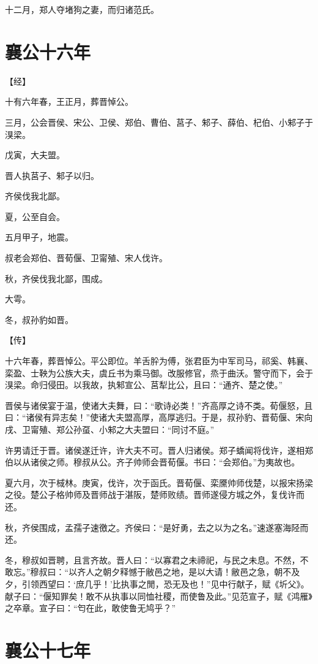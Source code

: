 \documentclass[a4paper,12pt,UTF8,twoside]{ctexbook}
\begin{document}
十二月，郑人夺堵狗之妻，而归诸范氏。

\chapter{襄公十六年}


【经】

十有六年春，王正月，葬晋悼公。

三月，公会晋侯、宋公、卫侯、郑伯、曹伯、莒子、邾子、薛伯、杞伯、小邾子于湨梁。

戊寅，大夫盟。

晋人执莒子、邾子以归。

齐侯伐我北鄙。

夏，公至自会。

五月甲子，地震。

叔老会郑伯、晋荀偃、卫甯殖、宋人伐许。

秋，齐侯伐我北鄙，围成。

大雩。

冬，叔孙豹如晋。

【传】

十六年春，葬晋悼公。平公即位。羊舌肸为傅，张君臣为中军司马，祁奚、韩襄、栾盈、士鞅为公族大夫，虞丘书为乘马御。改服修官，烝于曲沃。警守而下，会于湨梁。命归侵田。以我故，执邾宣公、莒犁比公，且曰：“通齐、楚之使。”

晋侯与诸侯宴于温，使诸大夫舞，曰：“歌诗必类！”齐高厚之诗不类。荀偃怒，且曰：“诸侯有异志矣！”使诸大夫盟高厚，高厚逃归。于是，叔孙豹、晋荀偃、宋向戌、卫甯殖、郑公孙虿、小邾之大夫盟曰：“同讨不庭。”

许男请迁于晋。诸侯遂迁许，许大夫不可。晋人归诸侯。郑子蟜闻将伐许，遂相郑伯以从诸侯之师。穆叔从公。齐子帅师会晋荀偃。书曰：“会郑伯。”为夷故也。

夏六月，次于棫林。庚寅，伐许，次于函氏。晋荀偃、栾黡帅师伐楚，以报宋扬梁之役。楚公子格帅师及晋师战于湛阪，楚师败绩。晋师遂侵方城之外，复伐许而还。

秋，齐侯围成，孟孺子速徼之。齐侯曰：“是好勇，去之以为之名。”速遂塞海陉而还。

冬，穆叔如晋聘，且言齐故。晋人曰：“以寡君之未禘祀，与民之未息。不然，不敢忘。”穆叔曰：“以齐人之朝夕释憾于敝邑之地，是以大请！敝邑之急，朝不及夕，引领西望曰：‘庶几乎！’比执事之閒，恐无及也！”见中行献子，赋《圻父》。献子曰：“偃知罪矣！敢不从执事以同恤社稷，而使鲁及此。”见范宣子，赋《鸿雁》之卒章。宣子曰：“匄在此，敢使鲁无鸠乎？”

\chapter{襄公十七年}
\end{document}

